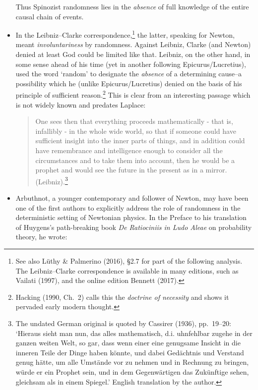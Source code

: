 \documentclass[11pt,a4paper]{article}
\numberwithin{equation}{section}
\begin{document}
\begin{itemize}
Thus Spinozist  randomness lies in the \emph{absence} of full knowledge of the entire causal chain of events.
\item In the Leibniz--Clarke correspondence,\footnote{See also  L\"{u}thy \& Palmerino (2016), \S 2.7 for part of the following analysis. The Leibniz--Clarke correspondence is available in many editions, such as Vailati (1997), and the online edition Bennett (2017).}  the latter, speaking for Newton, meant \emph{involuntariness} by randomness. Against Leibniz,
Clarke (and Newton) denied at least God could be  limited like that.
 Leibniz, on the other hand, in some sense ahead of his time (yet in another following  Epicurus/Lucretius),  used the word `random' to designate the \emph{absence} of a determining cause--a possibility which he (unlike Epicurus/Lucretius) denied on the basis of his principle of sufficient reason.\footnote{Hacking (1990, Ch.\ 2) calls this the \emph{doctrine of necessity} and shows it pervaded early modern thought.} This is clear from an interesting passage which is not widely known and predates Laplace:
 \begin{quote}\begin{small}
One sees then that everything proceeds mathematically - that is, infallibly - in the whole wide world, so that if someone could have sufficient insight into the inner parts of things, and in addition could have remembrance and intelligence enough to consider all the circumstances and to take them into account, then he would be a prophet and would see the future in the present as in a mirror. (Leibniz).\footnote{The undated German original is quoted by Cassirer (1936), pp.\ 19--20: 
`Hieraus sieht man nun, das alles mathematisch, d.i. uhnfehlbar zugehe in der ganzen weiten Welt, so gar, dass wenn einer eine genugsame Insicht in die inneren Teile der Dinge haben k\"{o}nnte, und dabei Ged\"{a}chtnis und Verstand genug h\"{a}tte, um alle Umst\"{a}nde vor zu nehmen und in Rechnung zu bringen, w\"{u}rde er ein Prophet sein, und in dem Gegenw\"{a}rtigen das Zuk\"{u}nftige sehen, gleichsam als in einem Spiegel.' English translation by the author. 
} 
\end{small}\end{quote}
\item Arbuthnot, a younger contemporary and follower of Newton, may have been one of the first authors to explicitly address the role of randomness in the deterministic setting of Newtonian physics. In the Preface to his  translation of Huygens's path-breaking book  \emph{De Ratiociniis in Ludo Aleae} on probability theory, he wrote:

\end{itemize}
\end{document}
